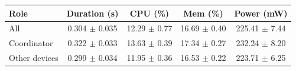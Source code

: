\begin{tabular}{lcccc}
\hline
\textbf{Role} & \textbf{Duration (s)} & \textbf{CPU (\%)} & \textbf{Mem (\%)} & \textbf{Power (mW)} \\
\hline
All & 0.304 $\pm$ 0.035 & 12.29 $\pm$ 0.77 & 16.69 $\pm$ 0.40 & 225.41 $\pm$ 7.44 \\
Coordinator & 0.322 $\pm$ 0.033 & 13.63 $\pm$ 0.39 & 17.34 $\pm$ 0.27 & 232.24 $\pm$ 8.20 \\
Other devices & 0.299 $\pm$ 0.034 & 11.95 $\pm$ 0.36 & 16.53 $\pm$ 0.22 & 223.71 $\pm$ 6.25 \\
\hline
\end{tabular}
